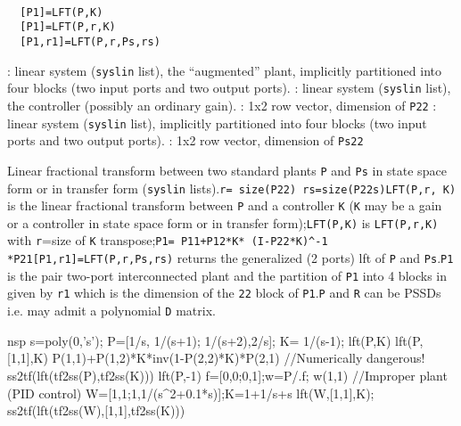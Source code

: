 \begin{mandesc}
   \\ %
\end{mandesc}
\begin{calling_sequence}
\begin{verbatim}
  [P1]=LFT(P,K)  
  [P1]=LFT(P,r,K)  
  [P1,r1]=LFT(P,r,Ps,rs)  
\end{verbatim}
\end{calling_sequence}
\begin{parameters}
  \begin{varlist}
    : linear system (\verb!syslin! list), the ``augmented'' plant, implicitly partitioned into four blocks (two input ports and two output ports).
    : linear system (\verb!syslin! list), the controller (possibly an ordinary gain).
    : 1x2 row vector, dimension of \verb!P22!
    : linear system (\verb!syslin! list), implicitly partitioned into four blocks (two input ports and two output ports).
    : 1x2 row vector, dimension of \verb!Ps22!
  \end{varlist}
\end{parameters}
\begin{mandescription}
  Linear fractional transform between two standard plants
  \verb!P! and \verb!Ps! in state space form or in
  transfer form (\verb!syslin! lists).\verb!r= size(P22) rs=size(P22s)!\verb!LFT(P,r, K)! is the linear fractional transform
  between \verb!P! and a controller \verb!K!
  (\verb!K! may be a gain or a controller in state space form
  or in transfer form);\verb!LFT(P,K)! is \verb!LFT(P,r,K)! with
  \verb!r!=size of \verb!K! transpose;\verb!P1= P11+P12*K* (I-P22*K)^-1 *P21!\verb![P1,r1]=LFT(P,r,Ps,rs)! returns the generalized (2
  ports) lft of \verb!P! and \verb!Ps!.\verb!P1! is the pair two-port interconnected plant and the
  partition of \verb!P1! into 4 blocks in given by
  \verb!r1! which is the dimension of the \verb!22!
  block of \verb!P1!.\verb!P! and \verb!R! can be PSSDs i.e. may admit a
  polynomial \verb!D! matrix.
\end{mandescription}
\begin{examples}
  \begin{mintednsp}{nsp}
    s=poly(0,'s');
    P=[1/s, 1/(s+1); 1/(s+2),2/s]; K= 1/(s-1);
    lft(P,K)
    lft(P,[1,1],K)
    P(1,1)+P(1,2)*K*inv(1-P(2,2)*K)*P(2,1)   //Numerically dangerous!
    ss2tf(lft(tf2ss(P),tf2ss(K)))
    lft(P,-1)
    f=[0,0;0,1];w=P/.f; w(1,1)
    //Improper plant (PID control)
    W=[1,1;1,1/(s^2+0.1*s)];K=1+1/s+s
    lft(W,[1,1],K); ss2tf(lft(tf2ss(W),[1,1],tf2ss(K)))
  \end{mintednsp}
\end{examples}
\begin{manseealso}
       
\end{manseealso}
